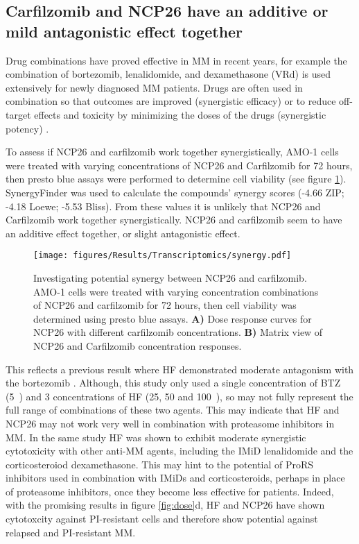 \subsection{Carfilzomib and NCP26 have an additive or mild antagonistic effect together}\label{subsec:synergy}
Drug combinations have proved effective in MM in recent years, for example the combination of bortezomib, lenalidomide, and dexamethasone (VRd) is used extensively for newly diagnosed MM patients.
Drugs are often used in combination so that outcomes are improved (synergistic efficacy) or to reduce off-target effects and toxicity by minimizing the doses of the drugs (synergistic potency) \cite{meyer2019quantifying}.

To assess if NCP26 and carfilzomib work together synergistically, AMO-1 cells were treated with varying concentrations of NCP26 and Carfilzomib for 72 hours, then presto blue assays were performed to determine cell viability (see figure \ref{fig:synergy}).
SynergyFinder \cite{zheng2021synergyfinder} was used to calculate the compounds' synergy scores (-4.66 ZIP; -4.18 Loewe; -5.53 Bliss).
From these values it is unlikely that NCP26 and Carfilzomib work together synergistically.
NCP26 and carfilzomib seem to have an additive effect together, or slight antagonistic effect.
\begin{figure}[h]
\centering
\texttt{[image: figures/Results/Transcriptomics/synergy.pdf]}
\caption[NCP26 and carfilzomib synergism]{Investigating potential synergy between NCP26 and carfilzomib.
AMO-1 cells were treated with varying concentration combinations of NCP26 and carfilzomib for 72 hours, then cell viability was determined using presto blue assays.
\textbf{A)} Dose response curves for NCP26 with different carfilzomib concentrations.
\textbf{B)} Matrix view of NCP26 and Carfilzomib concentration responses.
}
\label{fig:synergy}\end{figure}
This reflects a previous result where HF demonstrated moderate antagonism with the bortezomib \cite{leiba2012halofuginone}.
Although, this study only used a single concentration of BTZ (5\si{\nano\Molar}) and 3 concentrations of HF (25, 50 and 100\si{\nano\Molar}), so may not fully represent the full range of combinations of these two agents.
This may indicate that HF and NCP26 may not work very well in combination with proteasome inhibitors in MM.
In the same study HF was shown to exhibit moderate synergistic cytotoxicity with other anti-MM agents, including the IMiD lenalidomide and the corticosteroiod dexamethasone.
This may hint to the potential of ProRS inhibitors used in combination with IMiDs and corticosteroids, perhaps in place of proteasome inhibitors, once they become less effective for patients.
Indeed, with the promising results in figure \ref{fig:dose}d, HF and NCP26 have shown cytotoxcity against PI-resistant cells and therefore show potential against relapsed and PI-resistant MM\@.

